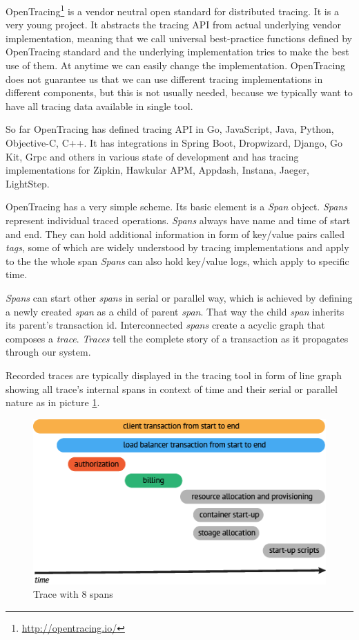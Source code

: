 \documentclass[12pt,oneside]{fithesis2}
\begin{document}
OpenTracing\footnote{\url{http://opentracing.io/}} is a vendor neutral open standard for distributed tracing. It is a very young project. It abstracts the tracing API from actual underlying vendor implementation, meaning that we call universal best-practice functions defined by OpenTracing standard and the underlying implementation tries to make the best use of them. At anytime we can easily change the implementation. OpenTracing does not guarantee us that we can use different tracing implementations in different components, but this is not usually needed, because we typically want to have all tracing data available in single tool.

So far OpenTracing has defined tracing API in Go, JavaScript, Java, Python, Objective-C, C++. It has integrations in Spring Boot, Dropwizard, Django, Go Kit, Grpc and others in various state of development and has tracing implementations for Zipkin, Hawkular APM, Appdash, Instana, Jaeger, LightStep.

OpenTracing has a very simple scheme. Its basic element is a \textit{Span} object. \textit{Spans} represent individual traced operations. \textit{Spans} always have name and time of start and end. They can hold additional information in form of key/value pairs called \textit{tags}, some of which are widely understood by tracing implementations and apply to the the whole span \textit{Spans} can also hold key/value logs, which apply to specific time.

\textit{Spans} can start other \textit{spans} in serial or parallel way, which is achieved by defining a newly created \textit{span} as a child of parent \textit{span}. That way the child \textit{span} inherits its parent's transaction id. Interconnected \textit{spans} create a acyclic graph that composes a \textit{trace}. \textit{Traces} tell the complete story of a transaction as it propagates through our system.

Recorded traces are typically displayed in the tracing tool in form of line graph showing all trace's internal spans in context of time and their serial or parallel nature as in picture \ref{opentracing2}.

\begin{figure}[ht!]
	\label{opentracing2}
	\centering
	\includegraphics[width=\textwidth]{images/opentracing2.png}
	\caption{Trace with 8 spans \cite{opentracing}}
\end{figure}
\end{document}
